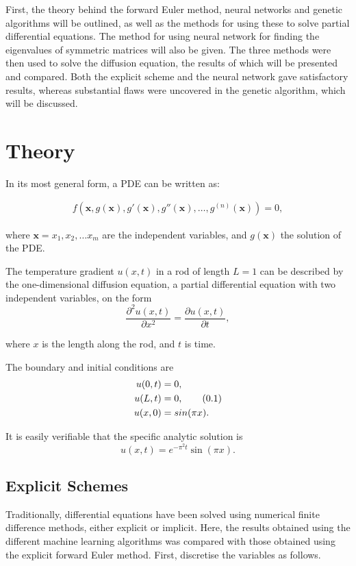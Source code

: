 \documentclass[multicolumn, 9pt]{extarticle}
\newcommand\numberthis{\addtocounter{equation}{1}\tag{\theequation}}
\begin{document}
First, the theory behind the forward Euler method, neural networks and genetic algorithms will be outlined, as well as the methods for using these to solve partial differential equations. The method for using neural network for finding the eigenvalues of symmetric matrices will also be given. The three methods were then used to solve the diffusion equation, the results of which will be presented and compared. Both the explicit scheme and the neural network gave satisfactory results, whereas substantial flaws were uncovered in the genetic algorithm, which will be discussed.


\section{Theory}
In its most general form, a PDE can be written as:

\begin{align}
	\label{eq:f-cost}
	f(\mathbf{x}, g(\mathbf{x}), g'(\mathbf{x}), g''(\mathbf{x}), \dots, g^{(n)}(\mathbf{x})) = 0,
\end{align}

where $\mathbf{x} = x_1, x_2, \dots x_m$ are the independent variables, and $g(\mathbf{x})$ the solution of the PDE.

The temperature gradient $u(x, t)$ in a rod of length $L=1$ can be described by the one-dimensional diffusion equation, a partial differential equation with two independent variables, on the form
\begin{equation}\label{eq:diff}
	\frac{\partial^2 u(x, t) }{\partial x^2} = \frac{\partial u(x, t)}{\partial t},
\end{equation}

where $x$ is the length along the rod, and $t$ is time.

The boundary and initial conditions are
\begin{align*}\label{eq:boundary}
	u(0, t) & = 0,             \\
	u(L, t) & = 0, \numberthis \\
	u(x, 0) & = sin(\pi x).
\end{align*}

It is easily verifiable that the specific analytic solution is
\begin{equation}\label{eq:anal}
	u(x, t) = e^{-\pi^2t}\sin(\pi x).
\end{equation}

\subsection{Explicit Schemes}
Traditionally, differential equations have been solved using numerical finite difference methods, either explicit or implicit. Here, the results obtained using the different machine learning algorithms was compared with those obtained using the explicit forward Euler method. First, discretise the variables as follows.
\end{document}
